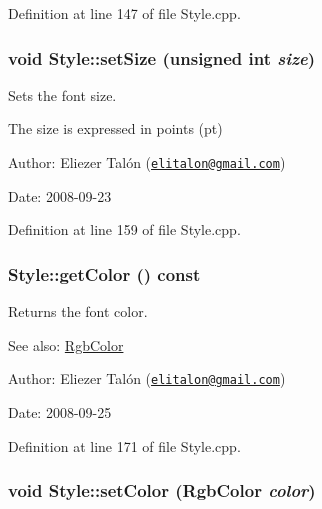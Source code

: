 Definition at line 147 of file Style.cpp.\hypertarget{class_style_1338ebe3d562a710fdc26f49d0082a7c}{
\subsubsection[setSize]{\setlength{\rightskip}{0pt plus 5cm}void Style::setSize (unsigned int {\em size})}}
\label{class_style_1338ebe3d562a710fdc26f49d0082a7c}


Sets the font size. 

The size is expressed in points (pt)

\begin{Desc}
\item[Author:]Eliezer Talón (\href{mailto:elitalon@gmail.com}{\tt elitalon@gmail.com}) \end{Desc}
\begin{Desc}
\item[Date:]2008-09-23 \end{Desc}


Definition at line 159 of file Style.cpp.\hypertarget{class_style_bd212fb31bc7e1e7502c18f9e0b6734c}{
\subsubsection[getColor]{ Style::getColor () const}}
\label{class_style_bd212fb31bc7e1e7502c18f9e0b6734c}


Returns the font color. 

\begin{Desc}
\item[See also:]\hyperlink{struct_rgb_color}{RgbColor}\end{Desc}
\begin{Desc}
\item[Author:]Eliezer Talón (\href{mailto:elitalon@gmail.com}{\tt elitalon@gmail.com}) \end{Desc}
\begin{Desc}
\item[Date:]2008-09-25 \end{Desc}


Definition at line 171 of file Style.cpp.\hypertarget{class_style_596534e321ac5c2f4444192f2cc0d793}{
\subsubsection[setColor]{\setlength{\rightskip}{0pt plus 5cm}void Style::setColor ({\bf RgbColor} {\em color})}}
\label{class_style_596534e321ac5c2f4444192f2cc0d793}


